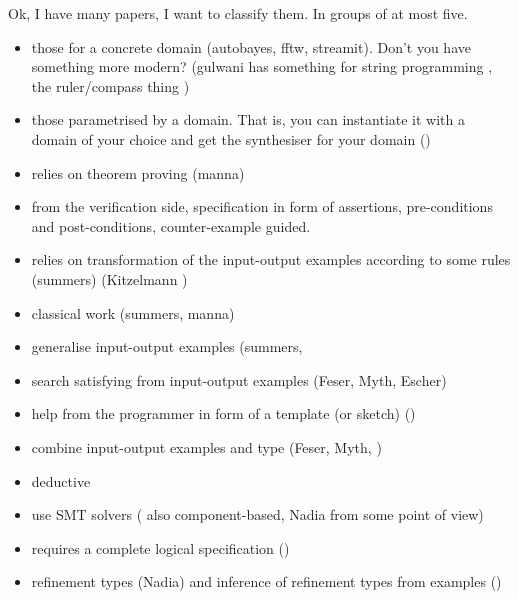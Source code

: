 Ok, I have many papers, I want to classify them. In groups of at most five.
\begin{itemize}
\item those for a concrete domain (autobayes, fftw, streamit). Don't you have something more modern? (gulwani has something for string programming \cite{Gulwani:2011:ASP:1926385.1926423}, the ruler/compass thing \cite{Gulwani:2011:SGC:1993498.1993505})
\item those parametrised by a domain. That is, you can instantiate it with a domain of your choice and get the synthesiser for your domain (\cite{Perelman:2014:TS:2594291.2594297}) 
\item relies on theorem proving (manna)
\item from the verification side, specification in form of assertions, pre-conditions and post-conditions, counter-example guided. \cite{LeonPaper} \cite{DBLP:journals/corr/InalaQLS15}
\item relies on transformation of the input-output examples according to some rules (summers) (Kitzelmann \cite{Kitzelmann:2009:AIF:1530575.1530582})
\item classical work (summers, manna)
\item generalise input-output examples (summers, \cite{Gulwani:2011:ASP:1926385.1926423}
\item search satisfying from input-output examples (Feser, Myth, Escher)
\item help from the programmer in form of a template (or sketch) (\cite{Solar-Lezama:2006:CSF:1168857.1168907})
\item combine input-output examples and type (Feser, Myth, \cite{Jha:2010:OCP:1806799.1806833})
\item deductive
\item use SMT solvers (\cite{Jha:2010:OCP:1806799.1806833} also component-based, Nadia from some point of view)
\item requires a complete logical specification (\cite{Kuncak:2010:CFS:1806596.1806632})
\item refinement types (Nadia) and inference of refinement types from examples (\cite{Frankle:2016:EST:2837614.2837629})
\end{itemize}

